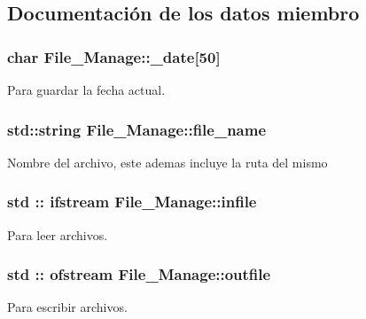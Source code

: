 \subsection{Documentación de los datos miembro}
\subsubsection[{\texorpdfstring{\+\_\+date}{_date}}]{\setlength{\rightskip}{0pt plus 5cm}char File\+\_\+\+Manage\+::\+\_\+date\mbox{[}50\mbox{]}\hspace{0.3cm}{\ttfamily [protected]}}\hypertarget{class_file___manage_a8bf6f9762a78137d34b859a86d595844}{}\label{class_file___manage_a8bf6f9762a78137d34b859a86d595844}
Para guardar la fecha actual. 
\subsubsection[{\texorpdfstring{file\+\_\+name}{file_name}}]{\setlength{\rightskip}{0pt plus 5cm}std\+::string File\+\_\+\+Manage\+::file\+\_\+name\hspace{0.3cm}{\ttfamily [protected]}}\hypertarget{class_file___manage_a34a7f1a17609e115811efc140a07a018}{}\label{class_file___manage_a34a7f1a17609e115811efc140a07a018}
Nombre del archivo, este ademas incluye la ruta del mismo 
\subsubsection[{\texorpdfstring{infile}{infile}}]{\setlength{\rightskip}{0pt plus 5cm}std \+:: ifstream File\+\_\+\+Manage\+::infile\hspace{0.3cm}{\ttfamily [protected]}}\hypertarget{class_file___manage_a8c530b8325a65e290ea3db405f91234a}{}\label{class_file___manage_a8c530b8325a65e290ea3db405f91234a}
Para leer archivos. 
\subsubsection[{\texorpdfstring{outfile}{outfile}}]{\setlength{\rightskip}{0pt plus 5cm}std \+:: ofstream File\+\_\+\+Manage\+::outfile\hspace{0.3cm}{\ttfamily [protected]}}\hypertarget{class_file___manage_ab1ba9c8b82239cec993eff15781ec0be}{}\label{class_file___manage_ab1ba9c8b82239cec993eff15781ec0be}
Para escribir archivos. 

